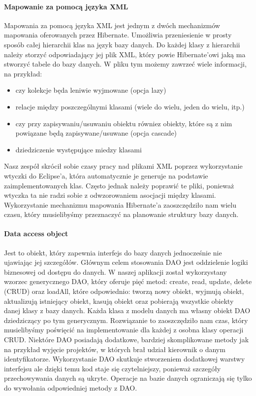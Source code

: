 \documentclass[licencjacka]{pracamgr}
\begin{document}
\paragraph{Mapowanie za pomocą języka XML}
Mapowania za pomocą języka XML jest jednym z dwóch mechanizmów mapowania oferowanych przez Hibernate. Umożliwia przeniesienie 
w prosty sposób całej hierarchii klas na język bazy danych. Do każdej klasy z hierarchii należy storzyć odpowiadający jej plik XML, 
który powie Hibernate'owi jaką ma stworzyć tabele do bazy danych. W pliku tym możemy zawrzeć wiele informacji, na przykład:
\begin{itemize}
\item czy kolekcje będa leniwie wyjmowane (opcja lazy)
\item relacje między poszczególnymi klasami (wiele do wielu, jeden do wielu, itp.)
\item czy przy zapisywaniu/usuwaniu obiektu równiez obiekty, które są z nim powiązane będą zapisywane/usuwane (opcja cascade)
\item dziedziczenie występujące miedzy klasami
\end{itemize}
Nasz zespół skrócił sobie czasy pracy nad plikami XML poprzez wykorzystanie wtyczki do Eclipse'a, która automatycznie je generuje   
na podstawie zaimplementowanych klas. Często jednak należy poprawić te pliki, ponieważ wtyczka ta nie radzi sobie z odwzorowaniem 
asocjacji między klasami. Wykorzystanie mechanizmu mapowania Hibernate'a zaoszczędziło nam wielu czasu, który musielibyśmy przeznaczyć 
na planowanie struktury bazy danych.

\paragraph{Data access object}
Jest to obiekt, który zapewnia interfejs do bazy danych jednocześnie nie ujawiając jej szczegółów. Głównym celem stosowania DAO jest
oddzielenie logiki biznesowej od dostępu do danych. W naszej aplikacji został wykorzystany wzorzec generycznego DAO, który oferuje 
pięć metod: create, read, update, delete (CRUD) oraz loadAll, które odpowiednio: tworzą nowy obiekt, wyjmują obiekt, aktualizują 
istniejący obiekt, kasują obiekt oraz pobierają wszystkie obiekty danej klasy z bazy danych. Każda klasa z modelu danych ma własny 
obiekt DAO dziedziczący po tym generycznym. Rozwiązanie to zaoszczędziło nam czas, który musielibyśmy poświęcić na implementowanie 
dla każdej z osobna klasy operacji CRUD. Niektóre DAO posiadają dodatkowe, bardziej skomplikowane metody jak na przykład wyjęcie projektów, 
w których brał udział kierownik o danym identyfikatorze. Wykorzystanie DAO skutkuje stworzeniem dodatkowej warstwy interfejsu ale dzięki 
temu kod staje się czytelniejszy, ponieważ szczegóły przechowywania danych są ukryte. Operacje na bazie danych ograniczają 
się tylko do wywołania odpowiedniej metody z DAO.
\end{document}
